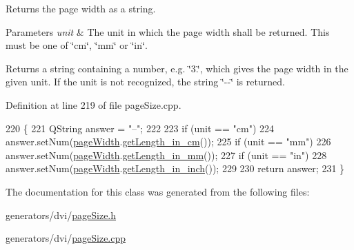 Returns the page width as a string. 


\begin{DoxyParams}{Parameters}
{\em unit} & The unit in which the page width shall be returned. This must be one of \char`\"{}cm\char`\"{}, \char`\"{}mm\char`\"{} or \char`\"{}in\char`\"{}.\\
\hline
\end{DoxyParams}
\begin{DoxyReturn}{Returns}
a string containing a number, e.\+g. \char`\"{}3.\char`\"{}, which gives the page width in the given unit. If the unit is not recognized, the string \char`\"{}-\/-\/\char`\"{} is returned. 
\end{DoxyReturn}


Definition at line 219 of file page\+Size.\+cpp.


\begin{DoxyCode}
220 \{
221   QString answer = \textcolor{stringliteral}{"--"};
222 
223   \textcolor{keywordflow}{if} (unit == \textcolor{stringliteral}{"cm"})
224     answer.setNum(\hyperlink{classSimplePageSize_ad5aa26a1789bd7b20dbca509a50cfcab}{pageWidth}.\hyperlink{classLength_a988932b7b90b6877fab6cda8b6518ba9}{getLength\_in\_cm}());
225   \textcolor{keywordflow}{if} (unit == \textcolor{stringliteral}{"mm"})
226     answer.setNum(\hyperlink{classSimplePageSize_ad5aa26a1789bd7b20dbca509a50cfcab}{pageWidth}.\hyperlink{classLength_ab57252f3b49a668104d76396b2c74041}{getLength\_in\_mm}());
227   \textcolor{keywordflow}{if} (unit == \textcolor{stringliteral}{"in"})
228     answer.setNum(\hyperlink{classSimplePageSize_ad5aa26a1789bd7b20dbca509a50cfcab}{pageWidth}.\hyperlink{classLength_afbaef4ba8d8a3e97873ed5cfd20c7dea}{getLength\_in\_inch}());
229 
230   \textcolor{keywordflow}{return} answer;
231 \}
\end{DoxyCode}


The documentation for this class was generated from the following files\+:\begin{DoxyCompactItemize}
\item 
generators/dvi/\hyperlink{pageSize_8h}{page\+Size.\+h}\item 
generators/dvi/\hyperlink{pageSize_8cpp}{page\+Size.\+cpp}\end{DoxyCompactItemize}
